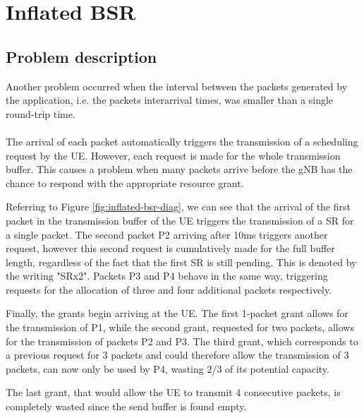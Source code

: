 \section{Inflated BSR}
\label{sec:inf-bsr}

\subsection{Problem description}
Another problem occurred when the interval between the packets generated by the application, i.e. the packets interarrival times, was smaller than a single round-trip time. 

\paragraph{}
The arrival of each packet automatically triggers the transmission of a scheduling request by the \ac{UE}. However, each request is made for the whole transmission buffer. This causes a problem when many packets arrive before the \ac{gNB} has the chance to respond with the appropriate resource grant.

Referring to Figure \ref{fig:inflated-bsr-diag}, we can see that the arrival of the first packet in the transmission buffer of the \ac{UE} triggers the transmission of a \ac{SR} for a single packet. The second packet P2 arriving after 10ms triggers another request, however this second request is cumulatively made for the full buffer length, regardless of the fact that the first \ac{SR} is still pending. This is denoted by the writing "SRx2". Packets P3 and P4 behave in the same way, triggering requests for the allocation of three and four additional packets respectively.

Finally, the grants begin arriving at the \ac{UE}. The first 1-packet grant allows for the transmission of P1, while the second grant, requested for two packets, allows for the transmission of packets P2 and P3. The third grant, which corresponds to a previous request for 3 packets and could therefore allow the transmission of 3 packets, can now only be used by P4, wasting 2/3 of its potential capacity. 

The last grant, that would allow the \ac{UE} to transmit 4 consecutive packets, is completely wasted since the send buffer is found empty.

